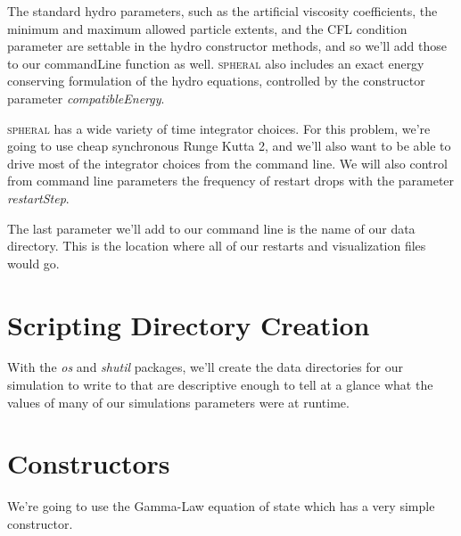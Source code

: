 \documentclass[11pt]{memoir}
\begin{document}


The standard hydro parameters, such as the artificial viscosity coefficients, the minimum and maximum allowed particle extents, and the CFL condition parameter are settable in the hydro constructor methods, and so we'll add those to our commandLine function as well. 
\textsc{spheral} also includes an exact energy conserving formulation of the hydro equations, controlled by the constructor parameter \textit{compatibleEnergy}.



\textsc{spheral} has a wide variety of time integrator choices. 
For this problem, we're going to use cheap synchronous Runge Kutta 2, and we'll also want to be able to drive most of the integrator choices from the command line. 
We will also control from command line parameters the frequency of restart drops with the parameter \textit{restartStep}.



The last parameter we'll add to our command line is the name of our data directory. 
This is the location where all of our restarts and visualization files would go.



\section{Scripting Directory Creation}

With the \textit{os} and \textit{shutil} packages, we'll create the data directories for our simulation to write to that are descriptive enough to tell at a glance what the values of many of our simulations parameters were at runtime.



\section{Constructors}

We're going to use the Gamma-Law equation of state which has a very simple constructor.


\end{document}
